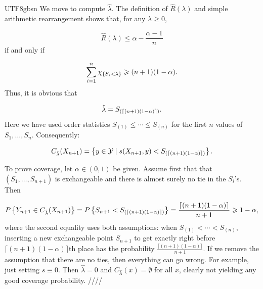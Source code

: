 \documentclass[../../main.tex]{subfiles}
\begin{document}
\begin{CJK*}{UTF8}{gbsn}
We move to compute $\hat{\lambda}$.
The definition of $\hat{R}(\lambda)$ and simple arithmetic rearrangement 
shows that,
for any $\lambda \geqslant 0$,

\begin{equation*}
    \hat{R}(\lambda) \leqslant \alpha - \frac{\alpha - 1}{n}
\end{equation*}
if and only if 

\begin{equation*}
    \sum_{i=1}^n \chi_{\left \{ S_i < \lambda \right \}} \geqslant (n+1)(1-\alpha).
\end{equation*}
Thus, it is obvious that 

\begin{equation*}
    \hat{\lambda} = S_{\left ( \lceil(n+1)(1-\alpha)\rceil \right )}.
\end{equation*}
Here
we have used order statistics $S_{(1)} \leqslant \cdots \leqslant S_{(n)}$
for the first $n$ values of $S_1, \ldots, S_n$.
Consequently:

\begin{equation*}
    C_{\hat{\lambda}}(X_{n+1})
    = \left \{ y \in \mathcal{Y} \mid s(X_{n+1}, y) < 
    S_{\left ( \lceil(n+1)(1-\alpha)\rceil \right )} \right \}.
\end{equation*}

To prove coverage, let $\alpha \in (0,1)$ be given.
Assume first that
that $(S_1, \ldots, S_{n+1})$ is exchangeable and 
there is almost surely no tie in the $S_i$'s.
Then

\begin{equation*}
    P\left \{ Y_{n+1} \in C_{\hat{\lambda}}(X_{n+1}) \right \}
    = P\left \{ S_{n+1} < S_{\left ( \lceil(n+1)(1-\alpha)\rceil \right )} \right \}
    = \frac{\lceil(n+1)(1-\alpha)\rceil}{n + 1} \geqslant 1 - \alpha,
\end{equation*}
where the second equality uses both assumptions:
when $S_{(1)} < \cdots < S_{(n)}$, inserting a new exchangeable 
point $S_{n+1}$ to get exactly right before $\lceil(n+1)(1-\alpha)\rceil$th place 
has the probability $\frac{\lceil(n+1)(1-\alpha)\rceil}{n + 1}$.
If we remove the assumption that there are no ties,
then everything can go wrong. For example,
just setting $s \equiv 0$.
Then $\hat{\lambda} = 0$ and $C_{\hat{\lambda}}(x)= \emptyset$ for all $x$,
clearly not yielding any good coverage probability.
////

\end{CJK*}
\end{document}
